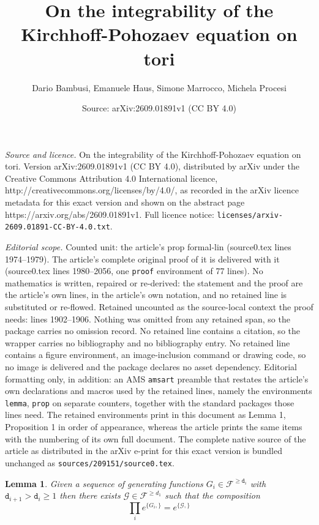 \documentclass[10pt,a4paper]{amsart}
\title{On the integrability of the Kirchhoff-Pohozaev equation on tori}
\author{Dario Bambusi, Emanuele Haus, Simone Marrocco, Michela Procesi}
\date{Source: arXiv:2609.01891v1 (CC BY 4.0)}
\newtheorem{lemma}{Lemma}
\newcommand{\cF}{{\mathcal F}}
\newcommand{\cG}{{\mathcal G}}
\newcommand{\td}{{\mathtt{d}}}
\begin{document}
\maketitle

\noindent\emph{Source and licence.} On the integrability of the Kirchhoff-Pohozaev equation on tori. Version arXiv:2609.01891v1 (CC BY 4.0), distributed by arXiv under the Creative Commons Attribution 4.0 International licence, http://creativecommons.org/licenses/by/4.0/, as recorded in the arXiv licence metadata for this exact version and shown on the abstract page https://arxiv.org/abs/2609.01891v1. Full licence notice: \texttt{licenses/arxiv-2609.01891-CC-BY-4.0.txt}.\par\smallskip

\noindent\textit{Editorial scope.} Counted unit: the article's prop formal-lin (source0.tex lines 1974--1979). The article's complete original proof of it is delivered with it (source0.tex lines 1980--2056, one \texttt{proof} environment of 77 lines). No mathematics is written, repaired or re-derived: the statement and the proof are the article's own lines, in the article's own notation, and no retained line is substituted or re-flowed.  Retained uncounted as the source-local context the proof needs: lines 1902--1906.  Nothing was omitted from any retained span, so the package carries no omission record.  No retained line contains a citation, so the wrapper carries no bibliography and no bibliography entry.  No retained line contains a figure environment, an image-inclusion command or drawing code, so no image is delivered and the package declares no asset dependency.  Editorial formatting only, in addition: an AMS \texttt{amsart} preamble that restates the article's own declarations and macros used by the retained lines, namely the environments \texttt{lemma}, \texttt{prop} on separate counters, together with the standard packages those lines need.  The retained environments print in this document as Lemma 1, Proposition 1 in order of appearance, whereas the article prints the same items with the numbering of its own full document.  The complete native source of the article as distributed in the arXiv e-print for this exact version is bundled unchanged as \texttt{sources/209151/source0.tex}.
\begin{lemma} \label{compo} Given a sequence of generating functions $G_i\in \cF^{{\geq} \td_i}$ with $\td_{i+1} > \td_i\geq 1$ then there exists $\cG\in \cF^{\geq d_1}$ such that the composition
	\[
	\prod_i	e^{\{G_i,\}} = e^{\{\cG,\}}
	\] 
\end{lemma}
\end{document}
